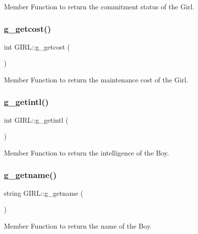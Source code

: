 Member Function to return the commitment status of the Girl. 

\mbox{\label{class_g_i_r_l_a2c1db89bcec0cbc299a562578a9eb095}} 
\subsubsection{\texorpdfstring{g\+\_\+getcost()}{g\_getcost()}}
{\footnotesize\ttfamily int G\+I\+R\+L\+::g\+\_\+getcost (\begin{DoxyParamCaption}{ }\end{DoxyParamCaption})}



Member Function to return the maintenance cost of the Girl. 

\mbox{\label{class_g_i_r_l_a297a2aae3f49b18d1dec20de8fbd6fd4}} 
\subsubsection{\texorpdfstring{g\+\_\+getintl()}{g\_getintl()}}
{\footnotesize\ttfamily int G\+I\+R\+L\+::g\+\_\+getintl (\begin{DoxyParamCaption}{ }\end{DoxyParamCaption})}



Member Function to return the intelligence of the Boy. 

\mbox{\label{class_g_i_r_l_a4e6773d24fa02ae3cbb32c6a0c7c2f40}} 
\subsubsection{\texorpdfstring{g\+\_\+getname()}{g\_getname()}}
{\footnotesize\ttfamily string G\+I\+R\+L\+::g\+\_\+getname (\begin{DoxyParamCaption}{ }\end{DoxyParamCaption})}



Member Function to return the name of the Boy. 


